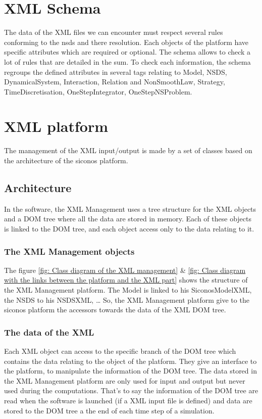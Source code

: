 \section{XML Schema}
The data of the XML files we can encounter must respect several rules conforming to the \ac{nsds}
and there resolution. Each objects of the platform have specific attributes which are required
or optional. The schema allows to check a lot of rules that are detailed in the \ac{sum}.
To check each information, the schema regroups the defined attributes in several tags relating to
Model, NSDS, DynamicalSystem, Interaction, Relation and NonSmoothLaw, Strategy, TimeDiscretisation,
OneStepIntegrator, OneStepNSProblem.


\section{XML platform}
The management of the XML input/output is made by a set of classes based on the architecture of the
\ac{siconos} platform.

\subsection{Architecture}
In the software, the XML Management uses a tree structure for the XML objects and a DOM tree where all
the data are stored in memory. Each of these objects is linked to the DOM tree, and each object access
only to the data relating to it.

\subsubsection{The XML Management objects}
The figure \ref{fig: Class diagram of the XML management} \& \ref{fig: Class diagram with the links between the platform and the XML part} shows the
structure of the XML Management platform.
The Model is linked to his SiconosModelXML, the NSDS to his NSDSXML, \dots
So, the XML Management platform give to the \ac{siconos} platform the accessors towards the data of the XML DOM tree.
\subsubsection{The data of the XML}
Each XML object can access to the specific branch of the DOM tree which contains the data relating to
the object of the platform. They give an interface to the platform, to manipulate the information of
the DOM tree.
The data stored in the XML Management platform are only used for input and output but never used during the
computations. That's to say the information of the DOM tree are read when the software is launched (if a XML input file is
defined) and data are stored to the DOM tree a the end of each time step of a simulation.
